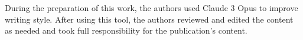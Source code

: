 \documentclass[cte]{acnsart}
\begin{document}

\begin{aideclaration}
	During the preparation of this work, the authors used Claude 3 Opus to improve writing style. After using this tool, the authors reviewed and edited the content as needed and took full responsibility for the publication’s content.
\end{aideclaration}





\appendix
\end{document}
